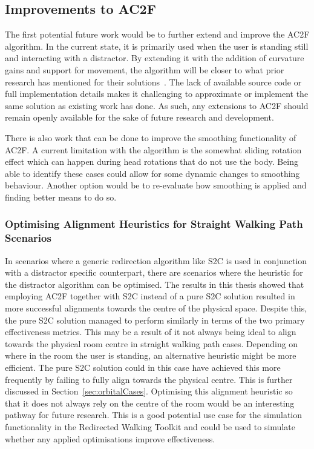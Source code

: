 \subsection{Improvements to AC2F}
The first potential future work would be to further extend and improve the AC2F algorithm. In the current state, it is primarily used when the user is standing still and interacting with a distractor. By extending it with the addition of curvature gains and support for movement, the algorithm will be closer to what prior research has mentioned for their solutions~\cite{peck2010improved, chen2017towards, chen2017supporting}. The lack of available source code or full implementation details makes it challenging to approximate or implement the same solution as existing work has done. As such, any extensions to AC2F should remain openly available for the sake of future research and development. 

There is also work that can be done to improve the smoothing functionality of AC2F. A current limitation with the algorithm is the somewhat sliding rotation effect which can happen during head rotations that do not use the body. Being able to identify these cases could allow for some dynamic changes to smoothing behaviour. Another option would be to re-evaluate how smoothing is applied and finding better means to do so. 

\subsubsection{Optimising Alignment Heuristics for Straight Walking Path Scenarios}
In scenarios where a generic redirection algorithm like S2C is used in conjunction with a distractor specific counterpart, there are scenarios where the heuristic for the distractor algorithm can be optimised. The results in this thesis showed that employing AC2F together with S2C instead of a pure S2C solution resulted in more successful alignments towards the centre of the physical space. Despite this, the pure S2C solution managed to perform similarly in terms of the two primary effectiveness metrics. This may be a result of it not always being ideal to align towards the physical room centre in straight walking path cases. Depending on where in the room the user is standing, an alternative heuristic might be more efficient. The pure S2C solution could in this case have achieved this more frequently by failing to fully align towards the physical centre. This is further discussed in Section~\ref{sec:orbitalCases}. Optimising this alignment heuristic so that it does not always rely on the centre of the room would be an interesting pathway for future research. This is a good potential use case for the simulation functionality in the Redirected Walking Toolkit and could be used to simulate whether any applied optimisations improve effectiveness. 

